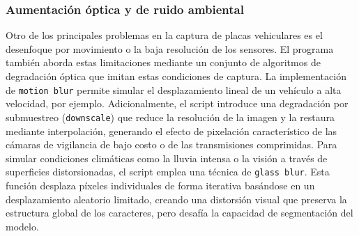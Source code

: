 \subsubsection*{Aumentación óptica y de ruido ambiental}
Otro de los principales problemas en la captura de placas vehiculares es el desenfoque por movimiento o la baja resolución de los sensores. El programa también aborda estas limitaciones mediante un conjunto de algoritmos de degradación óptica que imitan estas condiciones de captura. La implementación de \texttt{motion blur} permite simular el desplazamiento lineal de un vehículo a alta velocidad, por ejemplo. Adicionalmente, el script introduce una degradación por submuestreo (\texttt{downscale}) que reduce la resolución de la imagen y la restaura mediante interpolación, generando el efecto de pixelación característico de las cámaras de vigilancia de bajo costo o de las transmisiones comprimidas. Para simular condiciones climáticas como la lluvia intensa o la visión a través de superficies distorsionadas, el script emplea una técnica de \texttt{glass blur}. Esta función desplaza píxeles individuales de forma iterativa basándose en un desplazamiento aleatorio limitado, creando una distorsión visual que preserva la estructura global de los caracteres, pero desafía la capacidad de segmentación del modelo.
\vspace{0.7 cm}


